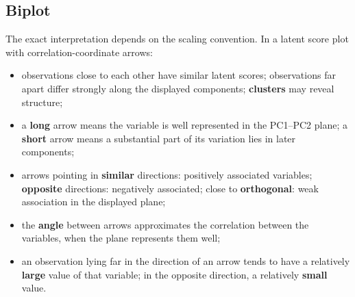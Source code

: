 
\subsection{Biplot}


The exact interpretation depends on the scaling convention. In a latent score plot with
correlation-coordinate arrows:
\begin{itemize}
  \item observations close to each other have similar latent scores; observations far apart differ strongly along the
        displayed components; \textbf{clusters} may reveal structure;
  \item a \textbf{long} arrow means the variable is well represented in the PC1--PC2 plane; a \textbf{short} arrow means
        a substantial part of its variation lies in later components;
  \item arrows pointing in \textbf{similar} directions: positively associated variables; \textbf{opposite} directions:
        negatively associated; close to \textbf{orthogonal}: weak association in the displayed plane;
  \item the \textbf{angle} between arrows approximates the correlation between the variables, when the plane represents them well;
  \item an observation lying far in the direction of an arrow tends to have a relatively \textbf{large} value of that
        variable; in the opposite direction, a relatively \textbf{small} value.
\end{itemize}

